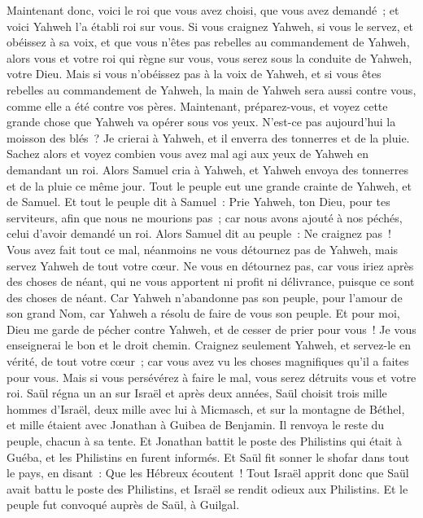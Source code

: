 \begin{multicols}{2}
Maintenant donc, voici le roi que vous avez choisi, que vous avez demandé~; et voici Yahweh l'a établi roi sur vous.
Si vous craignez Yahweh, si vous le servez, et obéissez à sa voix, et que vous n'êtes pas rebelles au commandement de Yahweh, alors vous et votre roi qui règne sur vous, vous serez sous la conduite de Yahweh, votre Dieu.
Mais si vous n'obéissez pas à la voix de Yahweh, et si vous êtes rebelles au commandement de Yahweh, la main de Yahweh sera aussi contre vous, comme elle a été contre vos pères.
Maintenant, préparez-vous, et voyez cette grande chose que Yahweh va opérer sous vos yeux.
N'est-ce pas aujourd'hui la moisson des blés~? Je crierai à Yahweh, et il enverra des tonnerres et de la pluie. Sachez alors et voyez combien vous avez mal agi aux yeux de Yahweh en demandant un roi.
Alors Samuel cria à Yahweh, et Yahweh envoya des tonnerres et de la pluie ce même jour. Tout le peuple eut une grande crainte de Yahweh, et de Samuel.
Et tout le peuple dit à Samuel~: Prie Yahweh, ton Dieu, pour tes serviteurs, afin que nous ne mourions pas~; car nous avons ajouté à nos péchés, celui d'avoir demandé un roi.
Alors Samuel dit au peuple~: Ne craignez pas~! Vous avez fait tout ce mal, néanmoins ne vous détournez pas de Yahweh, mais servez Yahweh de tout votre cœur.
Ne vous en détournez pas, car vous iriez après des choses de néant, qui ne vous apportent ni profit ni délivrance, puisque ce sont des choses de néant.
Car Yahweh n'abandonne pas son peuple, pour l'amour de son grand Nom, car Yahweh a résolu de faire de vous son peuple.
Et pour moi, Dieu me garde de pécher contre Yahweh, et de cesser de prier pour vous~! Je vous enseignerai le bon et le droit chemin.
Craignez seulement Yahweh, et servez-le en vérité, de tout votre cœur~; car vous avez vu les choses magnifiques qu'il a faites pour vous.
Mais si vous persévérez à faire le mal, vous serez détruits vous et votre roi.
\VerseOne{}Saül régna un an sur Israël et après deux années,
Saül choisit trois mille hommes d'Israël, deux mille avec lui à Micmasch, et sur la montagne de Béthel, et mille étaient avec Jonathan à Guibea de Benjamin. Il renvoya le reste du peuple, chacun à sa tente.
Et Jonathan battit le poste des Philistins qui était à Guéba, et les Philistins en furent informés. Et Saül fit sonner le shofar dans tout le pays, en disant~: Que les Hébreux écoutent~!
Tout Israël apprit donc que Saül avait battu le poste des Philistins, et Israël se rendit odieux aux Philistins. Et le peuple fut convoqué auprès de Saül, à Guilgal.

\end{multicols}
